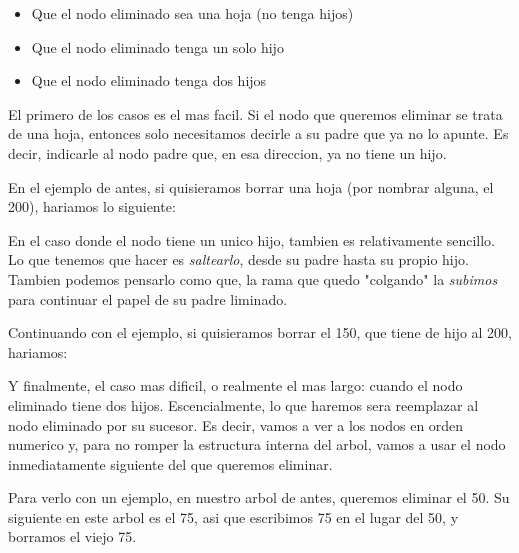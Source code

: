 \documentclass{article}
\begin{document}
\begin{itemize}
	\item Que el nodo eliminado sea una hoja (no tenga hijos)
	\item Que el nodo eliminado tenga un solo hijo
	\item Que el nodo eliminado tenga dos hijos
\end{itemize}

El primero de los casos es el mas facil. Si el nodo que queremos eliminar se trata de una hoja, entonces solo necesitamos decirle a su padre que ya no lo apunte. Es decir, indicarle al nodo padre que, en esa direccion, ya no tiene un hijo.

En el ejemplo de antes, si quisieramos borrar una hoja (por nombrar alguna, el 200), hariamos lo siguiente:

\begin{multicols}{2}

\end{multicols}

En el caso donde el nodo tiene un unico hijo, tambien es relativamente sencillo. Lo que tenemos que hacer es \textit{saltearlo}, desde su padre hasta su propio hijo. Tambien podemos pensarlo como que, la rama que quedo "colgando" la \textit{subimos} para continuar el papel de su padre liminado.

Continuando con el ejemplo, si quisieramos borrar el 150, que tiene de hijo al 200, hariamos:

\begin{multicols}{3}


\end{multicols}

Y finalmente, el caso mas dificil, o realmente el mas largo: cuando el nodo eliminado tiene dos hijos. Escencialmente, lo que haremos sera reemplazar al nodo eliminado por su sucesor. Es decir, vamos a ver a los nodos en orden numerico y, para no romper la estructura interna del arbol, vamos a usar el nodo inmediatamente siguiente del que queremos eliminar.

Para verlo con un ejemplo, en nuestro arbol de antes, queremos eliminar el 50. Su siguiente en este arbol es el 75, asi que escribimos 75 en el lugar del 50, y borramos el viejo 75.
\end{document}
